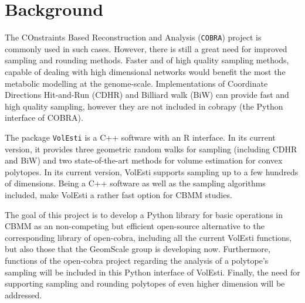 \documentclass[a4paper, 12pt]{article}
\def\volesti{{\tt volesti}}
\begin{document}













\section{Background}

The COnstraints Based Reconstruction and Analysis (\texttt{COBRA}) project is commonly used in such cases. However, there is still a great need for improved sampling and rounding methods. Faster and of high quality sampling methods, capable of dealing with high dimensional networks would benefit the most the metabolic modelling at the genome-scale. Implementations of Coordinate Directions Hit-and-Run (CDHR) and Billiard walk (BiW) can provide fast and high quality sampling, however they are not included in cobrapy (the Python interface of COBRA). 

The package \texttt{VolEsti} is a C++ software with an R interface. In its current version, it provides three geometric random walks for sampling (including CDHR and BiW) and two state-of-the-art methods for volume estimation for convex polytopes. In its current version, VolEsti supports sampling up to a few hundreds of dimensions. Being a C++ software as well as the sampling algorithms included, make VolEsti a rather fast option for CBMM studies. 

The goal of this project is to develop a Python library for basic operations in CBMM as an non-competing but efficient open-source alternative to the corresponding library of open-cobra, including all the current VolEsti functions, but also those that the GeomScale group is developing now. Furthermore, functions of the open-cobra project regarding the analysis of a polytope’s  sampling will be included in this Python interface of VolEsti. Finally, the need for supporting sampling and rounding polytopes of even higher dimension will be addressed. 
\end{document}
